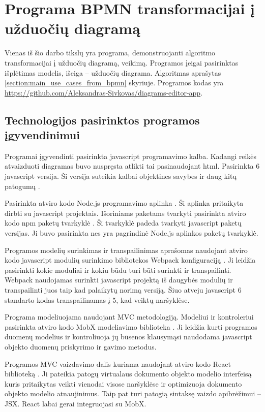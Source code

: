 \section{Programa BPMN transformacijai į užduočių diagramą}   


Vienas iš šio darbo tikslų yra programa, demonstruojanti algoritmo \BPMN transformacijai į užduočių diagramą, veikimą. Programos įeigai pasirinktas \BPMN išplėtimas \DVCM modelis, išeiga – užduočių diagrama. Algoritmas aprašytas \ref{section:main_use_cases_from_bpmn} skyriuje. Programos kodas yra \href{https://github.com/Aleksandras-Sivkovas/diagrams-editor-app}{https://github.com/Aleksandras-Sivkovas/diagrams-editor-app}.

\subsection{Technologijos pasirinktos programos įgyvendinimui}

Programai įgyvendinti pasirinkta javascript programavimo kalba. Kadangi reikės atvaizduoti diagramas buvo nuspręsta atlikti tai pasinaudojant html. Pasirinkta 6 javascript versija. Ši versija suteikia kalbai objektines savybes ir daug kitų patogumų \cite{EcmaScript}.

Pasirinkta atviro kodo Node.js programavimo aplinka \cite{nodeJs}. Ši aplinka pritaikyta dirbti su javascript projektais. Išoriniams paketams tvarkyti pasirinkta atviro kodo npm paketų tvarkyklė \cite{npmWebsite}. Ši tvarkyklė padeda tvarkyti javascript paketų versijas. Ji buvo pasirinkta nes yra pagrindinė Node.js aplinkos paketų tvarkyklė.

Programos modelių surinkimas ir transpailinimas aprašomas naudojant atviro kodo javascript modulių surinkimo bibliotekos Webpack konfiguraciją \cite{webpack}. Ji leidžia pasirinkti kokie moduliai ir kokiu būdu turi būti surinkti ir transpailinti. Webpack naudojamas surinkti javascript projektą iš daugybės modulių ir transpailinti juos taip kad palaikytų norimą versiją. Šiuo atveju javascript 6 standarto kodas transpailinamas į 5, kad veiktų naršyklėse.
 
Programa modeliuojama naudojant MVC metodologiją. Modeliui ir kontroleriui pasirinkta atviro kodo MobX modeliavimo biblioteka \cite{githubMobX}. Ji leidžia kurti programos duomenų modelius ir kontroliuoja jų būsenos klausymąsi naudodama javascript objekto duomenų priskyrimo ir gavimo metodus.

Programos MVC vaizdavimo dalis kuriama naudojant atviro kodo React biblioteką \cite{reactJs}. Ji pateikia patogų virtualaus dokumento objekto modelio interfeisą kuris pritaikytas veikti vienodai visose naršyklėse ir optimizuoja dokumento objekto modelio atnaujinimus. Taip pat turi patogią sintaksę vaizdo apibrėžimui – JSX. React labai gerai integruojasi su MobX.
